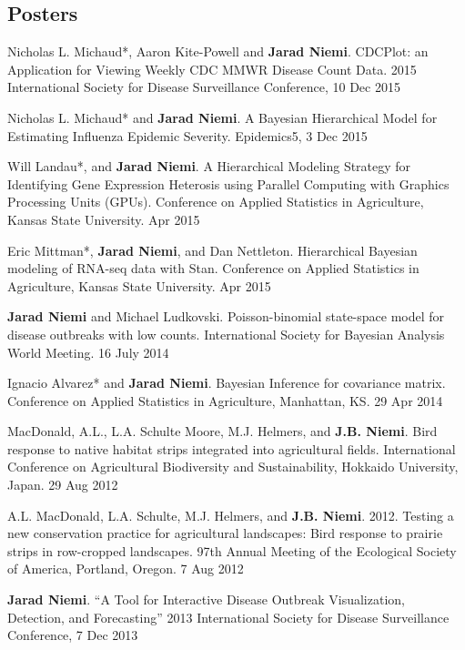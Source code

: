 \documentclass[overlapped,line]{res}
\begin{document}
\begin{resume}
{}


\section{\bf Posters}

{\small

Nicholas L. Michaud*, Aaron Kite-Powell and {\bf Jarad Niemi}. CDCPlot: an Application for Viewing Weekly CDC MMWR Disease Count Data. 2015 International Society for Disease Surveillance Conference, 10 Dec 2015

Nicholas L. Michaud* and {\bf Jarad Niemi}. A Bayesian Hierarchical Model for Estimating Influenza Epidemic Severity. Epidemics5, 3 Dec 2015

Will Landau*, and {\bf Jarad Niemi}. A Hierarchical Modeling Strategy for Identifying Gene Expression Heterosis using Parallel Computing with Graphics Processing Units (GPUs). Conference on Applied Statistics in Agriculture, Kansas State University. Apr 2015

Eric Mittman*, {\bf Jarad Niemi}, and Dan Nettleton. Hierarchical Bayesian modeling of RNA-seq data with Stan. Conference on Applied Statistics in Agriculture, Kansas State University. Apr 2015

{\bf Jarad Niemi} and Michael Ludkovski. Poisson-binomial state-space model for disease outbreaks with low counts. International Society for Bayesian Analysis World Meeting. 16 July 2014 


Ignacio Alvarez* and {\bf Jarad Niemi}. Bayesian Inference for covariance matrix. Conference on Applied Statistics in Agriculture, Manhattan, KS. 29 Apr 2014 


MacDonald, A.L., L.A. Schulte Moore, M.J. Helmers, and {\bf J.B. Niemi}.  Bird response to native habitat strips integrated into agricultural fields.  International Conference on Agricultural Biodiversity and Sustainability, Hokkaido University, Japan.  29 Aug 2012 



A.L. MacDonald, L.A. Schulte, M.J. Helmers, and {\bf J.B. Niemi}.  2012.  Testing a new conservation practice for agricultural landscapes: Bird response to prairie strips in row-cropped landscapes.  97th Annual Meeting of the Ecological Society of America, Portland, Oregon. 7 Aug 2012 

{\bf Jarad Niemi}. ``A Tool for Interactive Disease Outbreak Visualization, Detection, and Forecasting'' 2013 International Society for Disease Surveillance Conference, 7 Dec 2013


}
\end{resume}
\end{document}
